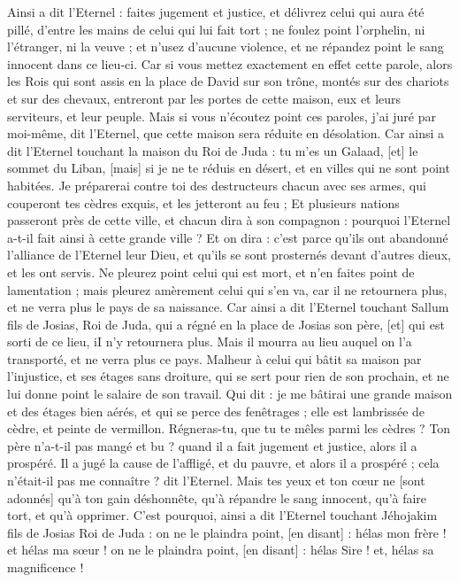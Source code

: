 \begin{multicols}{2}
Ainsi a dit l'Eternel : faites jugement et justice, et délivrez celui qui aura été pillé, d'entre les mains de celui qui lui fait tort ; ne foulez point l'orphelin, ni l'étranger, ni la veuve ; et n'usez d'aucune violence, et ne répandez point le sang innocent dans ce lieu-ci.
Car si vous mettez exactement en effet cette parole, alors les Rois qui sont assis en la place de David sur son trône, montés sur des chariots et sur des chevaux, entreront par les portes de cette maison, eux et leurs serviteurs, et leur peuple.
Mais si vous n'écoutez point ces paroles, j'ai juré par moi-même, dit l'Eternel, que cette maison sera réduite en désolation.
Car ainsi a dit l'Eternel touchant la maison du Roi de Juda : tu m'es un Galaad, [et] le sommet du Liban, [mais] si je ne te réduis en désert, et en villes qui ne sont point habitées.
Je préparerai contre toi des destructeurs chacun avec ses armes, qui couperont tes cèdres exquis, et les jetteront au feu ;
Et plusieurs nations passeront près de cette ville, et chacun dira à son compagnon : pourquoi l'Eternel a-t-il fait ainsi à cette grande ville ?
Et on dira : c'est parce qu'ils ont abandonné l'alliance de l'Eternel leur Dieu, et qu'ils se sont prosternés devant d'autres dieux, et les ont servis.
Ne pleurez point celui qui est mort, et n'en faites point de lamentation ; mais pleurez amèrement celui qui s'en va, car il ne retournera plus, et ne verra plus le pays de sa naissance.
Car ainsi a dit l'Eternel touchant Sallum fils de Josias, Roi de Juda, qui a régné en la place de Josias son père, [et] qui est sorti de ce lieu, iI n'y retournera plus.
Mais il mourra au lieu auquel on l'a transporté, et ne verra plus ce pays.
Malheur à celui qui bâtit sa maison par l'injustice, et ses étages sans droiture, qui se sert pour rien de son prochain, et ne lui donne point le salaire de son travail.
Qui dit : je me bâtirai une grande maison et des étages bien aérés, et qui se perce des fenêtrages ; elle est lambrissée de cèdre, et peinte de vermillon.
Régneras-tu, que tu te mêles parmi les cèdres ? Ton père n'a-t-il pas mangé et bu ? quand il a fait jugement et justice, alors il a prospéré.
Il a jugé la cause de l'affligé, et du pauvre, et alors il a prospéré ; cela n'était-il pas me connaître ? dit l'Eternel.
Mais tes yeux et ton cœur ne [sont adonnés] qu'à ton gain déshonnête, qu'à répandre le sang innocent, qu'à faire tort, et qu'à opprimer.
C'est pourquoi, ainsi a dit l'Eternel touchant Jéhojakim fils de Josias Roi de Juda : on ne le plaindra point, [en disant] : hélas mon frère ! et hélas ma sœur ! on ne le plaindra point, [en disant] : hélas Sire ! et, hélas sa magnificence !

\end{multicols}

